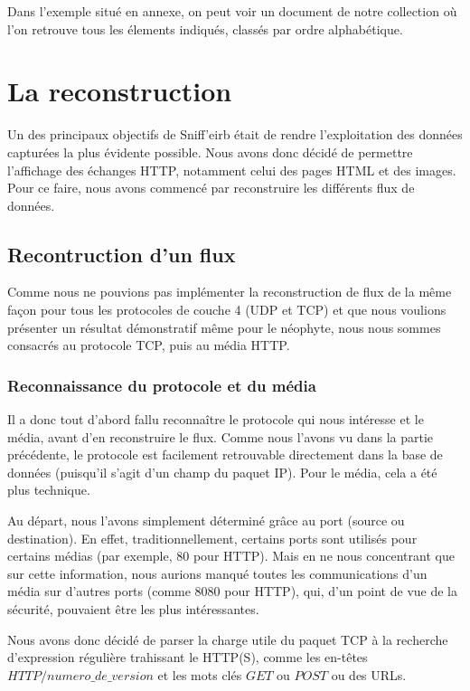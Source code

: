 Dans l'exemple situé en annexe, on peut voir un document de notre collection où l'on retrouve tous les élements indiqués, classés par ordre alphabétique.


\section{La reconstruction}

Un des principaux objectifs de Sniff'eirb était de rendre l'exploitation des données capturées la plus évidente possible.
Nous avons donc décidé de permettre l'affichage des échanges HTTP, notamment celui des pages HTML et des images. Pour ce
faire, nous avons commencé par reconstruire les différents flux de données.

\subsection{Recontruction d'un flux}

Comme nous ne pouvions pas implémenter la reconstruction de flux de la même façon pour tous les protocoles de couche 4 (UDP et TCP) et
que nous voulions présenter un résultat démonstratif même pour le néophyte, nous nous sommes consacrés au protocole TCP, puis au média HTTP.


\subsubsection {Reconnaissance du protocole et du média}
Il a donc tout d'abord fallu reconnaître le protocole qui nous intéresse et le média, avant d'en reconstruire le flux. Comme nous l'avons vu 
dans la partie précédente, le protocole est facilement retrouvable directement dans la base de données (puisqu'il s'agit d'un champ du paquet IP). 
Pour le média, cela a été plus technique. 

Au départ, nous l'avons simplement déterminé grâce au port (source ou destination). En effet, traditionnellement,
certains ports sont utilisés pour certains médias (par exemple, 80 pour HTTP). Mais en ne nous concentrant que sur cette information, nous aurions manqué
toutes les communications d'un média sur d'autres ports (comme 8080 pour HTTP), qui, d'un point de vue de la sécurité, pouvaient être les plus intéressantes.


Nous avons donc décidé de parser la charge utile du paquet TCP à la recherche d'expression régulière trahissant le HTTP(S), comme les en-têtes
 $HTTP/numero\_de\_version$ et les mots clés $GET$ ou $POST$ ou des URLs.


